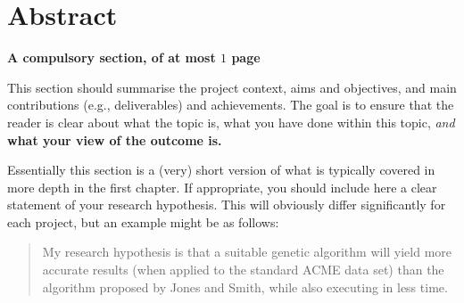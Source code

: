 \documentclass[ %
                    author={Daniel Page},
                supervisor={Dr. Andrew Calway},
                    degree={MSc},
                     title={Some Structural Guidelines for Data Science MSc Theses, Including Those With Long Titles that Run Across Multiple Lines on the Front Page},
                  subtitle={And those including an optional subtitle too, for good measure},
                      type={},
                      year={2021}]{dissertation}
\begin{document}
\frontmatter


\makedecl


\tableofcontents
\listoffigures
\listoftables
\listofalgorithms
\lstlistoflistings



\chapter*{Abstract}

{\bf A compulsory section, of at most $1$ page} 
\vspace{1cm} 

\noindent
This section should summarise the project context, aims and objectives,
and main contributions (e.g., deliverables) and achievements.  The goal is to ensure that the 
reader is clear about what the topic is, what you have done within this 
topic, {\em and}\/ {\bf what your view of the outcome is.}

Essentially 
this section is a (very) short version of what is typically covered in more depth in the first 
chapter.  If appropriate, you should include here  
a clear statement of your research hypothesis.  This will obviously differ significantly
for each project, but an example might be as follows:

\begin{quote}
My research hypothesis is that a suitable genetic algorithm will yield
more accurate results (when applied to the standard ACME data set) than 
the algorithm proposed by Jones and Smith, while also executing in less
time.
\end{quote}
\end{document}
